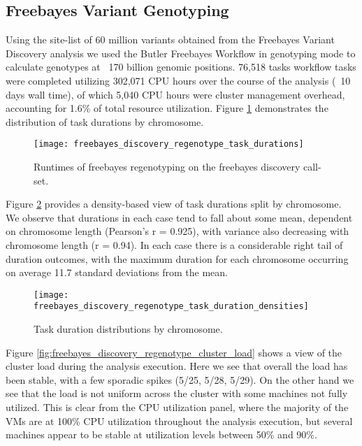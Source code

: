 \subsection{Freebayes Variant Genotyping}

Using the site-list of 60 million variants obtained from the Freebayes Variant Discovery analysis we used the Butler Freebayes Workflow in genotyping mode to calculate genotypes at ~170 billion genomic positions. 76,518 tasks workflow tasks were completed utilizing 302,071 CPU hours over the course of the analysis (~10 days wall time), of which 5,040 CPU hours were cluster management overhead, accounting for 1.6\% of total resource utilization. Figure  \ref{fig:freebayes_discovery_regenotype_task_durations} demonstrates the distribution of task durations by chromosome.

\begin{figure}[h!]
\texttt{[image: freebayes\_discovery\_regenotype\_task\_durations]}
\centering
\caption {Runtimes of freebayes regenotyping on the freebayes discovery call-set.}
\label{fig:freebayes_discovery_regenotype_task_durations}
\end{figure}

Figure \ref{fig:freebayes_discovery_regenotype_task_duration_densities} provides a density-based view of task durations split by chromosome. We observe that durations in each case tend to fall about some mean, dependent on chromosome length (Pearson's r = 0.925), with variance also decreasing with chromosome length (r = 0.94). In each case there is a considerable right tail of duration outcomes, with the maximum duration for each chromosome occurring on average 11.7 standard deviations from the mean.

\begin{figure}[h!]
\texttt{[image: freebayes\_discovery\_regenotype\_task\_duration\_densities]}
\centering
\caption {Task duration distributions by chromosome.}
\label{fig:freebayes_discovery_regenotype_task_duration_densities}
\end{figure}

Figure \ref{fig:freebayes_discovery_regenotype_cluster_load} shows a view of the cluster load during the analysis execution. Here we see that overall the load has been stable, with a few sporadic spikes (5/25, 5/28, 5/29). On the other hand we see that the load is not uniform across the cluster with some machines not fully utilized. This is clear from the CPU utilization panel, where the majority of the VMs are at 100\% CPU utilization throughout the analysis execution, but several machines appear to be stable at utilization levels between 50\% and 90\%.

